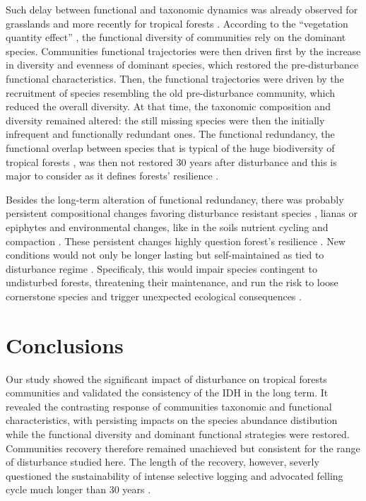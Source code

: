 \documentclass[fleqn,10pt]{ArtEcoFoG} %
\theoremstyle{definition}
\theoremstyle{definition}
\theoremstyle{definition}
\theoremstyle{remark}
\begin{document}
Such delay between functional and taxonomic dynamics was already
observed for grasslands \citep{Tilman1997, Mouillot2011} and more
recently for tropical forests \citep{Lohbeck2015, Guariguata2001}.
According to the ``vegetation quantity effect'' \citep{Grime1998}, the
functional diversity of communities rely on the dominant species.
Communities functional trajectories were then driven first by the
increase in diversity and evenness of dominant species, which restored
the pre-disturbance functional characteristics. Then, the functional
trajectories were driven by the recruitment of species resembling the
old pre-disturbance community, which reduced the overall diversity. At
that time, the taxonomic composition and diversity remained altered: the
still missing species were then the initially infrequent and
functionally redundant ones. The functional redundancy, the functional
overlap between species that is typical of the huge biodiversity of
tropical forests \citep{Bellwood2006}, was then not restored 30 years
after disturbance and this is major to consider as it defines forests'
resilience \citep{Trenbath1999, Elmqvist2003, Diaz2005}.

Besides the long-term alteration of functional redundancy, there was
probably persistent compositional changes favoring disturbance resistant
species \citep{Haddad2008}, lianas or epiphytes \citep{Martin2013} and
environmental changes, like in the soils nutrient cycling and compaction
\citep{Olander2005}. These persistent changes highly question forest's
resilience \citep{Chazdon2003a}. New conditions would not only be longer
lasting but self-maintained as tied to disturbance regime
\citep{Burslem2000}. Specificaly, this would impair species contingent
to undisturbed forests, threatening their maintenance, and run the risk
to loose cornerstone species and trigger unexpected ecological
consequences \citep{Jones1994, Diaz2005, Gardner2007}.

\section{Conclusions}\label{conclusions}

Our study showed the significant impact of disturbance on tropical
forests communities and validated the consistency of the IDH in the long
term. It revealed the contrasting response of communities taxonomic and
functional characteristics, with persisting impacts on the species
abundance distibution while the functional diversity and dominant
functional strategies were restored. Communities recovery therefore
remained unachieved but consistent for the range of disturbance studied
here. The length of the recovery, however, severly questioned the
sustainability of intense selective logging and advocated felling cycle
much longer than 30 years \citep{Gourlet-Fleury2005}.
\end{document}
